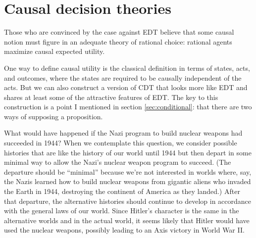 
\section{Causal decision theories}

Those who are convinced by the case against EDT believe that some
causal notion must figure in an adequate theory of rational choice:
rational agents maximize causal expected utility.

One way to define causal utility is the classical definition in terms
of states, acts, and outcomes, where the states are required to be
causally independent of the acts.  But we can also construct a version
of CDT that looks more like EDT and shares at least some of the
attractive features of EDT. The key to this construction is a point I
mentioned in section \ref{sec:conditional}: that there are two ways of
supposing a proposition.

What would have happened if the Nazi program to build nuclear weapons
had succeeded in 1944? When we contemplate this question, we consider
possible histories that are like the history of our world until 1944
but then depart in some minimal way to allow the Nazi's nuclear
weapon program to succeed. (The departure should be ``minimal''
because we're not interested in worlds where, say, the Nazis learned
how to build nuclear weapons from gigantic aliens who invaded the
Earth in 1944, destroying the continent of America as they landed.)
After that departure, the alternative histories should continue to
develop in accordance with the general laws of our world. Since
Hitler's character is the same in the alternative worlds and in the
actual world, it seems likely that Hitler would have used the nuclear
weapons, possibly leading to an Axis victory in World War II.

